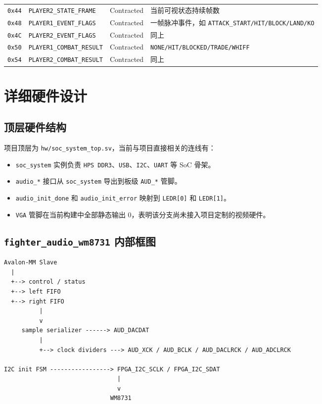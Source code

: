 \documentclass[12pt,a4paper]{ctexart}
\begin{document}
\begin{longtable}{>{\raggedright\arraybackslash}p{} >{\raggedright\arraybackslash}p{} >{\raggedright\arraybackslash}p{} >{\raggedright\arraybackslash}p{}}
\texttt{0x44} & \texttt{PLAYER2\_STATE\_FRAME} & Contracted & 当前可视状态持续帧数 \\
\texttt{0x48} & \texttt{PLAYER1\_EVENT\_FLAGS} & Contracted & 一帧脉冲事件，如 \texttt{ATTACK\_START/HIT/BLOCK/LAND/KO} \\
\texttt{0x4C} & \texttt{PLAYER2\_EVENT\_FLAGS} & Contracted & 同上 \\
\texttt{0x50} & \texttt{PLAYER1\_COMBAT\_RESULT} & Contracted & \texttt{NONE/HIT/BLOCKED/TRADE/WHIFF} \\
\texttt{0x54} & \texttt{PLAYER2\_COMBAT\_RESULT} & Contracted & 同上 \\
\bottomrule
\end{longtable}

\section{详细硬件设计}

\subsection{顶层硬件结构}

项目顶层为 \texttt{hw/soc\_system\_top.sv}，当前与项目直接相关的连线有：

\begin{itemize}
  \item \texttt{soc\_system} 实例负责 \texttt{HPS DDR3}、\texttt{USB}、\texttt{I2C}、\texttt{UART} 等 SoC 骨架。
  \item \texttt{audio\_*} 接口从 \texttt{soc\_system} 导出到板级 \texttt{AUD\_*} 管脚。
  \item \texttt{audio\_init\_done} 和 \texttt{audio\_init\_error} 映射到 \texttt{LEDR[0]} 和 \texttt{LEDR[1]}。
  \item \texttt{VGA} 管脚在当前构建中全部静态输出 0，表明该分支尚未接入项目定制的视频硬件。
\end{itemize}

\subsection{\texttt{fighter\_audio\_wm8731} 内部框图}

\begin{lstlisting}[style=fighterstyle]
Avalon-MM Slave
  |
  +--> control / status
  +--> left FIFO
  +--> right FIFO
          |
          v
     sample serializer ------> AUD_DACDAT
          |
          +--> clock dividers ---> AUD_XCK / AUD_BCLK / AUD_DACLRCK / AUD_ADCLRCK

I2C init FSM -----------------> FPGA_I2C_SCLK / FPGA_I2C_SDAT
                                |
                                v
                              WM8731
\end{lstlisting}
\end{document}
